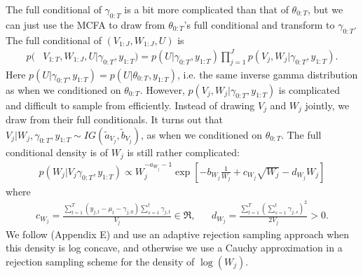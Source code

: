 \documentclass[graybox]{svmult}
\begin{document}
The full conditional of $\gamma_{0:T}$ is a bit more complicated than that of $\theta_{0:T}$, but we can just use the MCFA to draw from $\theta_{0:T}$'s full conditional and transform to $\gamma_{0:T}$. The full conditional of $(V_{1:J},W_{1:J},U)$ is 
\begin{align*}
p(&V_{1:T},W_{1:J},U|\gamma_{0:T},y_{1:T})=p(U|\gamma_{0:T},y_{1:T})\prod_{j=1}^Jp(V_j,W_j|\gamma_{0:T},y_{1:T}).
\end{align*}
Here $p(U|\gamma_{0:T},y_{1:T})=p(U|\theta_{0:T},y_{1:T})$, i.e. the same inverse gamma distribution as when we conditioned on $\theta_{0:T}$. However, $p(V_j,W_j|\gamma_{0:T},y_{1:T})$ is complicated and difficult to sample from efficiently. Instead of drawing $V_j$ and $W_j$ jointly, we draw from their full conditionals. It turns out that $V_j|W_j,\gamma_{0:T},y_{1:T} \sim IG(\tilde{a}_{V_j},\tilde{b}_{V_j})$, as when we conditioned on $\theta_{0:T}$. The full conditional density is of $W_j$ is still rather complicated:
\begin{align*}
p(W_j|V_j\gamma_{0:T},y_{1:T}) \propto W_j^{-a_{W_j}-1}\exp\left[-b_{W_j}\frac{1}{W_j} + c_{W_j}\sqrt{W_j} - d_{W_j}W_j\right]
\end{align*}
where
\begin{align*}
c_{W_j}=\frac{\sum_{t=1}^T(y_{j,t} - \mu_t - \gamma_{j,0})\sum_{s=1}^t\gamma_{j,t}}{V_j}\in\Re,&&d_{W_j} = \frac{\sum_{t=1}^T\left(\sum_{s=1}^t\gamma_{j,s}\right)^2}{2V_j} >0.
\end{align*}
We follow \citet{simpson2014interweaving} (Appendix E) and use an adaptive rejection sampling approach \citep{gilks1992adaptive} when this density is log concave, and otherwise we use a Cauchy approximation in a rejection sampling scheme for the density of $\log(W_j)$.
\end{document}
